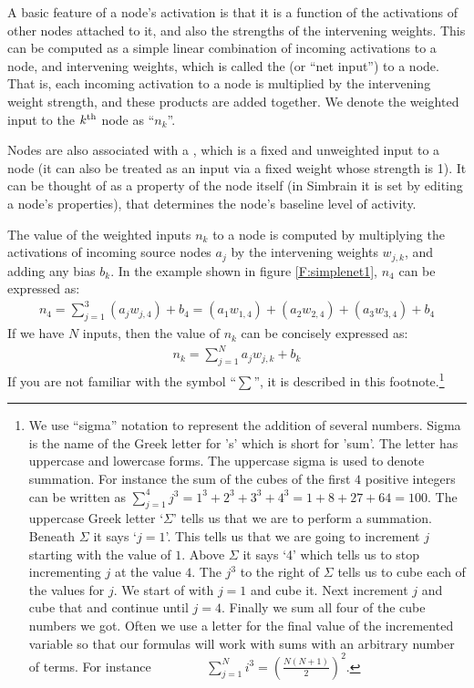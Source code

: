 A basic feature of a node's activation is that it is a function of the activations of other nodes attached to it, and also the strengths of the intervening weights. This can be computed as a simple linear combination of incoming activations to a node, and intervening weights, which is called the   (or ``net input'') to a node. That is, each incoming activation to a node is multiplied by the intervening weight strength, and these products are added together. We denote the weighted input to the $k^{\rm th}$ node as ``$n_k$''. 

Nodes are also associated with a , which is a fixed and unweighted input to a node (it can also be treated as an input via a fixed weight whose strength is 1). It can be thought of as a property of the node itself (in Simbrain it is set by editing a node's properties), that determines the node's baseline level of activity.

The value of the weighted inputs $n_k$ to a node is computed by multiplying the activations of incoming 
source nodes $a_j$ by the intervening weights $w_{j,k}$, and adding any bias $b_k$.
In the example shown in figure \ref{F:simplenet1},  $n_4$ can be expressed as:
\begin{eqnarray*}
n_4 = \sum_{j=1}^{3} (a_j w_{j,4})  + b_4 = (a_1 w_{1,4})  + (a_2 w_{2,4}) + 
(a_3 w_{3,4}) + b_4
\end{eqnarray*}
If we have $N$ inputs, then the value 
of $n_k$ can be concisely expressed as:
\begin{eqnarray*}
n_k = \sum_{j=1}^{N} a_j w_{j,k}  + b_k
\end{eqnarray*}
If you are not familiar with the symbol ``$\sum$'', it is described in this footnote.\footnote{We use ``sigma'' notation to represent the 
addition of several numbers. Sigma is the name of the Greek letter for 's' 
which is short for 'sum'. The letter has uppercase and lowercase forms. The 
uppercase sigma is used to denote summation. For instance the sum of the cubes 
of the first $4$ positive integers can be written as 
$\displaystyle{\sum_{j=1}^{4} j^3 = 1^3 + 2^3 + 3^3 + 4^3 = 1 + 8 + 27 + 64 = 
100}$. The uppercase Greek letter `$\Sigma$' tells us that we are to perform a 
summation. Beneath $\Sigma$ it says `$j=1$'. This tells us that we are going 
to increment $j$ starting with the value of $1$. Above $\Sigma$ it says `4' 
which tells us to stop incrementing $j$ at the value $4$. The $j^3$ to the 
right of $\Sigma$ tells us to cube each of the values for $j$. We start of 
with $j=1$ and cube it. Next increment $j$ and cube that and continue until 
$j=4$. Finally we sum all four of the cube numbers we got. Often we use a 
letter for the final value of the incremented variable so that our formulas 
will work with sums with an arbitrary number of terms. For instance 
$\displaystyle{\qquad \qquad \sum_{j=1}^{N} i^3 = 
\left(\frac{N(N+1)}{2}\right)^2}$.}

